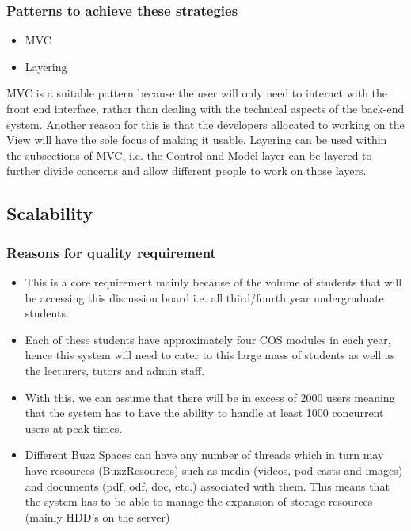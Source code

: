 \documentclass[a4paper,12pt]{report}
\begin{document}
 \subsubsection{Patterns to achieve these strategies}
 \begin{itemize}
 \item MVC
 \item Layering
\end{itemize}
MVC is a suitable pattern because the user will only need to interact with the front end interface, rather than dealing with the technical aspects of the back-end system. Another reason for this is that the developers allocated to working on the View will have the sole focus of making it usable.
Layering can be used within the subsections of MVC, i.e. the Control and Model layer can be layered to further divide concerns and allow different people to work on those layers.

\subsection{Scalability}
	\subsubsection{Reasons for quality requirement}
	\begin{itemize}
	\item This is a core requirement mainly because of the volume of students that will be accessing this discussion board i.e. all third/fourth year undergraduate students.
	\item Each of these students have approximately four COS modules in each year, hence this system will need to cater to this large mass of students as well as the lecturers, tutors and admin staff.
	\item With this, we can assume that there will be in excess of 2000 users meaning that the system has to have the ability to handle at least 1000 concurrent users at peak times.
	\item Different Buzz Spaces can have any number of threads which in turn may have resources (BuzzResources) such as media (videos, pod-casts and images) and documents (pdf, odf, doc, etc.) associated with them. This means that the system has to be able to manage the expansion of storage resources (mainly HDD's on the server)
	\end{itemize}
\end{document}
